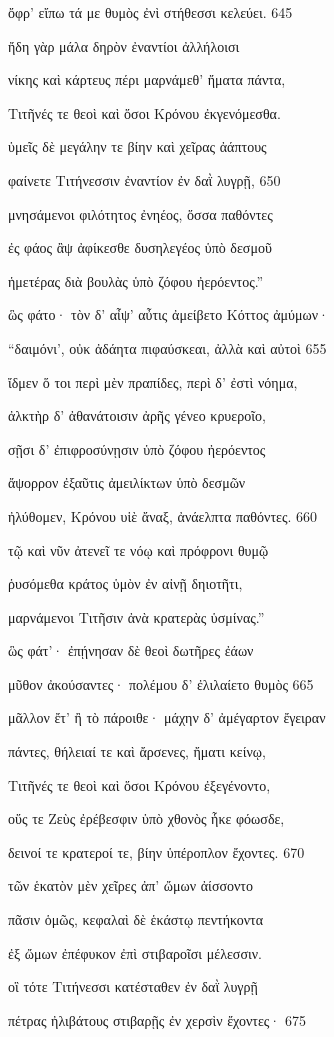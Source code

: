 ὄφρ' εἴπω τά με θυμὸς ἐνὶ στήθεσσι κελεύει. 645 

ἤδη γὰρ μάλα δηρὸν ἐναντίοι ἀλλήλοισι

νίκης καὶ κάρτευς πέρι μαρνάμεθ' ἤματα πάντα, 

Τιτῆνές τε θεοὶ καὶ ὅσοι Κρόνου ἐκγενόμεσθα.

ὑμεῖς δὲ μεγάλην τε βίην καὶ χεῖρας ἀάπτους

φαίνετε Τιτήνεσσιν ἐναντίον ἐν δαῒ λυγρῇ, 650

μνησάμενοι φιλότητος ἐνηέος, ὅσσα παθόντες

ἐς φάος ἂψ ἀφίκεσθε δυσηλεγέος ὑπὸ δεσμοῦ

ἡμετέρας διὰ βουλὰς ὑπὸ ζόφου ἠερόεντος.''

ὣς φάτο· τὸν δ' αἶψ' αὖτις ἀμείβετο Κόττος ἀμύμων· 

``δαιμόνι', οὐκ ἀδάητα πιφαύσκεαι, ἀλλὰ καὶ αὐτοὶ 655 

ἴδμεν ὅ τοι περὶ μὲν πραπίδες, περὶ δ' ἐστὶ νόημα,

ἀλκτὴρ δ' ἀθανάτοισιν ἀρῆς γένεο κρυεροῖο, 

σῇσι δ' ἐπιφροσύνῃσιν ὑπὸ ζόφου ἠερόεντος

ἄψορρον ἐξαῦτις ἀμειλίκτων ὑπὸ δεσμῶν

ἠλύθομεν, Κρόνου υἱὲ ἄναξ, ἀνάελπτα παθόντες. 660

τῷ καὶ νῦν ἀτενεῖ τε νόῳ καὶ πρόφρονι θυμῷ

ῥυσόμεθα κράτος ὑμὸν ἐν αἰνῇ δηιοτῆτι, 

μαρνάμενοι Τιτῆσιν ἀνὰ κρατερὰς ὑσμίνας.'' 

ὣς φάτ'· ἐπῄνησαν δὲ θεοὶ δωτῆρες ἐάων 

μῦθον ἀκούσαντες· πολέμου δ' ἐλιλαίετο θυμὸς 665 

μᾶλλον ἔτ' ἢ τὸ πάροιθε· μάχην δ' ἀμέγαρτον ἔγειραν 

πάντες, θήλειαί τε καὶ ἄρσενες, ἤματι κείνῳ,

Τιτῆνές τε θεοὶ καὶ ὅσοι Κρόνου ἐξεγένοντο,

οὕς τε Ζεὺς ἐρέβεσφιν ὑπὸ χθονὸς ἧκε φόωσδε,

δεινοί τε κρατεροί τε, βίην ὑπέροπλον ἔχοντες. 670

τῶν ἑκατὸν μὲν χεῖρες ἀπ' ὤμων ἀίσσοντο

πᾶσιν ὁμῶς, κεφαλαὶ δὲ ἑκάστῳ πεντήκοντα

ἐξ ὤμων ἐπέφυκον ἐπὶ στιβαροῖσι μέλεσσιν.

οἳ τότε Τιτήνεσσι κατέσταθεν ἐν δαῒ λυγρῇ

πέτρας ἠλιβάτους στιβαρῇς ἐν χερσὶν ἔχοντες· 675 

